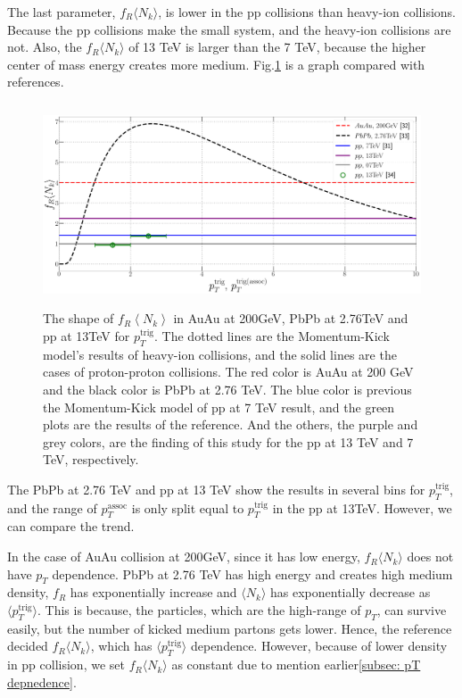 \documentclass[jkps,fleqn,showpacs,showkeys]{revtex4}
\begin{document}
The last parameter, $f_R \langle N_k \rangle$, is lower in the pp collisions than heavy-ion collisions.
Because the pp collisions make the small system, and the heavy-ion collisions are not.
Also, the $f_R \langle N_k \rangle$ of 13 TeV is larger than the 7 TeV, because the higher center of mass energy creates more medium.
Fig.\ref{figure:frnk} is a graph compared with references\cite{Wong_1, PbPb, Hanul}.


\begin{figure}[ht]
  \centering
  \includegraphics[width=12cm, height=6cm]{./Figures/Paper_frnk}
  \caption{The shape of $f_R \left\langle N_k \right\rangle$ in AuAu at 200GeV, PbPb at 2.76TeV and pp at 13TeV for $p_{T}^{\text{trig}}$.
  The dotted lines are the Momentum-Kick model's results of heavy-ion collisions, and the solid lines are the cases of proton-proton collisions.
  The red color is AuAu at 200 GeV\cite{Wong_1} and the black color is PbPb at 2.76 TeV\cite{PbPb}.
  The blue color is previous the Momentum-Kick model of pp at 7 TeV result\cite{Wong_5}, and the green plots are the results of the reference\cite{Hanul}.
  And the others, the purple and grey colors, are the finding of this study for the pp at 13 TeV and 7 TeV, respectively.
  }
  \label{figure:frnk}
\end{figure}

The PbPb at 2.76 TeV and pp at 13 TeV show the results in several bins for $p_T^{\text{trig}}$, and the range of $p_T^{\text{assoc}}$ is only split equal to $p_T^{\text{trig}}$ in the pp at 13TeV.
However, we can compare the trend.

In the case of AuAu collision at 200GeV, since it has low energy, $f_R \langle N_k \rangle$ does not have $p_T$ dependence.
PbPb at 2.76 TeV has high energy and creates high medium density, $f_R$ has exponentially increase and $\langle N_k \rangle$ has exponentially decrease as $\langle p_T^{\text{trig}} \rangle$.
This is because, the particles, which are the high-range of $p_T$, can survive easily, but the number of kicked medium partons gets lower.
Hence, the reference\cite{PbPb} decided $f_R \langle N_k \rangle$, which has $\langle p_T^{\text{trig}} \rangle$ dependence.
However, because of lower density in pp collision, we set $f_R \langle N_k \rangle$ as constant due to mention earlier\ref{subsec: pT depnedence}.
\end{document}
